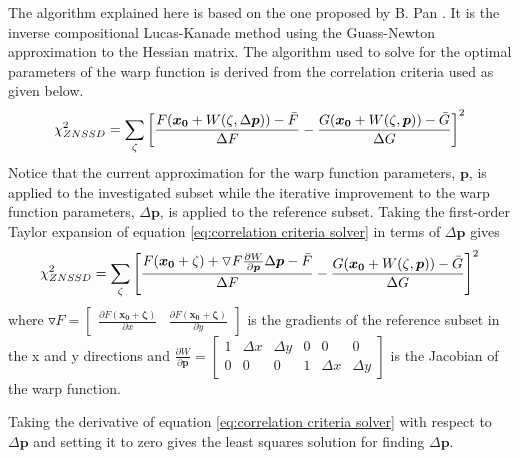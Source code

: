 \documentclass[[12pt,oneside,openany,a4paper, %
\newcommand*\mean[1]{\bar{#1}} %
\begin{document}
The algorithm explained here is based on the one proposed by B. Pan \cite{panfast}. It is the inverse compositional Lucas-Kanade method using the Guass-Newton approximation to the Hessian matrix. The algorithm used to solve for the optimal parameters of the warp function is derived from the correlation criteria used as given below.
\begin{equation}
  \chi_{ZNSSD}^2 = \sum_{\zeta}  \left[ \frac{F(\bm{x_0}+W(\zeta,\Delta \bm{p}))-\mean{F}}{\Delta F} -\frac{G(\bm{x_0}+W(\zeta,\bm{p}))-\mean{G}}{\Delta G}\right]^2
  \label{eq:correlation criteria solver}
\end{equation}
Notice that the current approximation for the warp function parameters, $\bm{p}$, is applied to the investigated subset while the iterative improvement to the warp function parameters, $\Delta \bm{p}$, is applied to the reference subset. Taking the first-order Taylor expansion of equation \ref{eq:correlation criteria solver} in terms of $\Delta \bm{p}$ gives
\begin{equation}
  \chi_{ZNSSD}^2 = \sum_{\zeta}  \left[ \frac{F(\bm{x_0}+\zeta)+\triangledown F \frac{\partial W}{\partial \bm{p}} \Delta\bm{p}-\mean{F}}{\Delta F} -\frac{G(\bm{x_0}+W(\zeta,\bm{p}))-\mean{G}}{\Delta G}\right]^2
\end{equation}
where $\triangledown F = \begin{bmatrix} \frac{\partial F(\bm{x_0} + \bm{\zeta})}{\partial x} & \frac{\partial F(\bm{x_0} + \bm{\zeta})}{\partial y} \end{bmatrix}$ is the gradients of the reference subset in the x and y directions and $\frac{\partial W}{\partial \bm{p}} = \begin{bmatrix} 1 & \Delta x & \Delta y & 0 & 0 & 0 \\ 0 & 0 & 0 & 1 & \Delta x & \Delta y \end{bmatrix}$ is the Jacobian of the warp function.

Taking the derivative of equation \ref{eq:correlation criteria solver} with respect to $\Delta \bm{p}$ and setting it to zero gives the least squares solution for finding $\Delta \bm{p}$.
\end{document}
